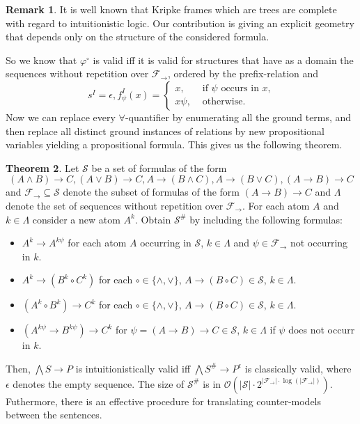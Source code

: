 \documentclass[a4paper,11pt]{report}
\theoremstyle{definition}
\newtheorem{theorem}{Theorem}[section]
\theoremstyle{definition}
\theoremstyle{definition}
\theoremstyle{definition}
\theoremstyle{definition}
\theoremstyle{definition}
\theoremstyle{definition}
\newtheorem{remark}[theorem]{Remark}
\begin{document}
	
	\begin{remark}
		It is well known that Kripke frames which are trees are complete with regard to intuitionistic logic. Our contribution is giving an explicit geometry that depends only on the structure of the considered formula.
	\end{remark}
	
	
	So we know that $\varphi^\circ$ is valid iff it is valid for structures that have as a domain the sequences without repetition over $\mathcal F_\to$, ordered by the prefix-relation and $$s^I = \epsilon, f_\psi^I(x) = \begin{cases}
		x, &\text{ if $\psi$ occurs in $x$,}\\
		x\psi, &\text{ otherwise.}
	\end{cases}$$
	Now we can replace every $\forall$-quantifier by enumerating all the ground terms, and then replace all distinct ground instances of relations by new propositional variables yielding a propositional formula. This gives us the following theorem.
	
	\begin{theorem}
		Let $\mathcal S$ be a set of formulas of the form
		$$(A\wedge B)\to C, (A\vee B)\to C, A\to (B\wedge C), A\to(B\vee C), (A\to B)\to C$$
		and $\mathcal F_\to\subseteq\mathcal S$ denote the subset of formulas of the form $(A\to B)\to C$ and $\Lambda$ denote the set of sequences without repetition over $\mathcal F_\to$. For each atom $A$ and $k\in\Lambda$ consider a new atom $A^k$. Obtain $\mathcal S^\#$ by including the following formulas:
		\begin{itemize}
			\item $A^k\to A^{k\psi}$ for each atom $A$ occurring in $\mathcal S$, $k\in\Lambda$ and $\psi\in\mathcal F_\to$ not occurring in $k$.
			\item $A^k\to (B^k\circ C^k)$ for each $\circ\in\{\wedge,\vee\}$, $A\to (B\circ C)\in\mathcal S$, $k\in\Lambda$.
			\item $(A^k\circ B^k)\to C^k$ for each $\circ\in\{\wedge,\vee\}$, $A\to (B\circ C)\in\mathcal S$, $k\in\Lambda$.
			\item $(A^{k\psi}\to B^{k\psi})\to C^k$ for $\psi = (A\to B)\to C\in\mathcal S$, $k\in\Lambda$ if $\psi$ does not occurr in $k$.
		\end{itemize}
		Then, $\bigwedge S\to P$ is intuitionistically valid iff $\bigwedge S^\#\to P^\epsilon$ is classically valid, where $\epsilon$ denotes the empty sequence. The size of $\mathcal S^\#$ is in $\mathcal O(|\mathcal S|\cdot2^{|\mathcal F_\to|\cdot\log(|\mathcal F_\to|)})$. Futhermore, there is an effective procedure for translating counter-models between the sentences.
	\end{theorem}
\end{document}
